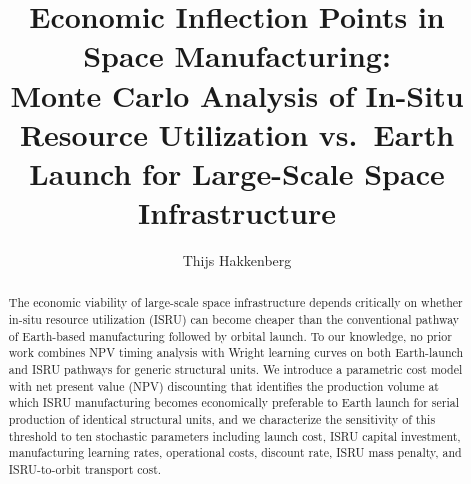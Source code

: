 \documentclass[preprint,12pt]{elsarticle}
\begin{document}
\begin{frontmatter}

\title{Economic Inflection Points in Space Manufacturing:\\ Monte Carlo Analysis of In-Situ Resource Utilization vs.\ Earth Launch for Large-Scale Space Infrastructure}

\author[dyson]{Thijs Hakkenberg}

\address[dyson]{Project Dyson, Open Research Initiative}

\begin{abstract}
The economic viability of large-scale space infrastructure depends critically on whether in-situ resource utilization (ISRU) can become cheaper than the conventional pathway of Earth-based manufacturing followed by orbital launch. To our knowledge, no prior work combines NPV timing analysis with Wright learning curves on both Earth-launch and ISRU pathways for generic structural units. We introduce a parametric cost model with net present value (NPV) discounting that identifies the production volume at which ISRU manufacturing becomes economically preferable to Earth launch for serial production of identical structural units, and we characterize the sensitivity of this threshold to ten stochastic parameters including launch cost, ISRU capital investment, manufacturing learning rates, operational costs, discount rate, ISRU mass penalty, and ISRU-to-orbit transport cost.


\end{abstract}
\end{frontmatter}
\end{document}
